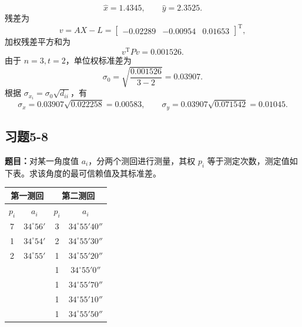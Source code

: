\documentclass[UTF8,zihao=-4]{ctexart}
\newcommand{\problem}[1]{\subsection*{#1}}
\newcommand{\timu}{\noindent\textbf{题目：}}
\begin{document}
{\begin{equation*}
    \hat x=1.4345,
    \qquad
    \hat y=2.3525.
\end{equation*}
残差为
\begin{equation*}
    v=AX-L=\begin{bmatrix}-0.02289&-0.00954&0.01653\end{bmatrix}^{\mathrm T},
\end{equation*}
加权残差平方和为
\begin{equation*}
    v^{\mathrm T}Pv=0.001526.
\end{equation*}
由于 $n=3,t=2$，单位权标准差为
\begin{equation*}
    \sigma_0=\sqrt{\frac{0.001526}{3-2}}=0.03907.
\end{equation*}
根据 $\sigma_{x_i}=\sigma_0\sqrt{d_{ii}}$，有
\begin{equation*}
    \sigma_x=0.03907\sqrt{0.022258}=0.00583,
    \qquad
    \sigma_y=0.03907\sqrt{0.071542}=0.01045.
\end{equation*}

\problem{习题5-8}
\timu 对某一角度值 $a_i$，分两个测回进行测量，其权 $p_i$ 等于测定次数，测定值如下表。求该角度的最可信赖值及其标准差。

\begin{center}
\small
\begin{tabular}{cc|cc}
\toprule
\multicolumn{2}{c|}{第一测回} & \multicolumn{2}{c}{第二测回}\\
\midrule
$p_i$ & $a_i$ & $p_i$ & $a_i$\\
\midrule
7 & $34^\circ56'$ & 3 & $34^\circ55'40''$\\
1 & $34^\circ54'$ & 2 & $34^\circ55'30''$\\
2 & $34^\circ55'$ & 1 & $34^\circ55'20''$\\
  &                 & 1 & $34^\circ55'0''$\\
  &                 & 1 & $34^\circ55'70''$\\
  &                 & 1 & $34^\circ55'10''$\\
  &                 & 1 & $34^\circ55'50''$\\
\bottomrule
\end{tabular}
\end{center}

}
\end{document}
